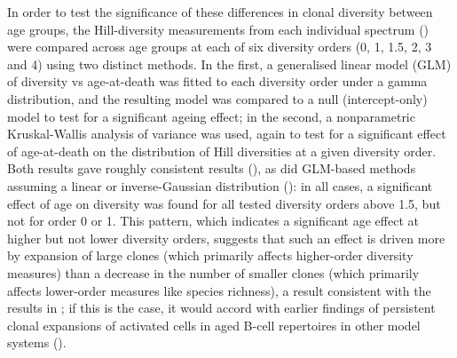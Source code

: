 In order to test the significance of these differences in clonal diversity between age groups, the Hill-diversity measurements from each individual spectrum () were compared across age groups at each of six diversity orders (0, 1, 1.5, 2, 3 and 4) using two distinct methods. In the first, a generalised linear model (GLM) of diversity vs age-at-death was fitted to each diversity order under a gamma distribution, and the resulting model was compared to a null (intercept-only) model to test for a significant ageing effect; in the second, a nonparametric Kruskal-Wallis analysis of variance was used, again to test for a significant effect of age-at-death on the distribution of Hill diversities at a given diversity order. Both results gave roughly consistent results (), as did GLM-based methods assuming a linear or inverse-Gaussian distribution (): in all cases, a significant effect of age on diversity was found for all tested diversity orders above 1.5, but not for order 0 or 1. This pattern, which indicates a significant age effect at higher but not lower diversity orders, suggests that such an effect is driven more by expansion of large clones (which primarily affects higher-order diversity measures) than a decrease in the number of smaller clones (which primarily affects lower-order measures like species richness), a result consistent with the results in ; if this is the case, it would accord with earlier findings of persistent clonal expansions of activated cells in aged B-cell repertoires in other model systems ().


